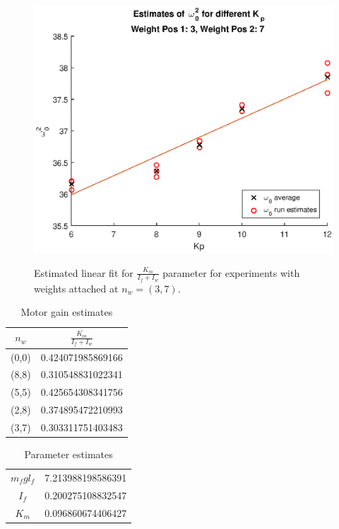 \documentclass[12pt]{article}
\begin{document}
\begin{figure}[htbp]
\includegraphics[scale=1]{gfx/km_37}
\label{fig:km_37}
\caption{Estimated linear fit for $\frac{K_m}{I_f+I_w}$ parameter for experiments with weights attached at $n_w = (3,7)$.}
\end{figure}

\begin{table}
\caption{Motor gain estimates}
\label{tab:km}
\begin{center}
\begin{tabular}{c|c}
$n_w$ & $\frac{K_m}{I_f+I_w}$ \\ \hline 
(0,0) &   0.424071985869166\\
(8,8) &  0.310548831022341 	\\
(5,5) & 0.425654308341756 \\
(2,8) & 0.374895472210993 \\
(3,7) & 0.303311751403483 \\
\end{tabular}
\end{center}
\end{table}

\begin{table}
\caption{Parameter estimates}
\label{tab:param}
\begin{center}
\begin{tabular}{c|c}
$m_fgl_f$  & 7.213988198586391\\
$I_f$ & 0.200275108832547\\
$K_m$ & 0.096860674406427\\
\end{tabular}
\end{center}
\end{table}
\end{document}
